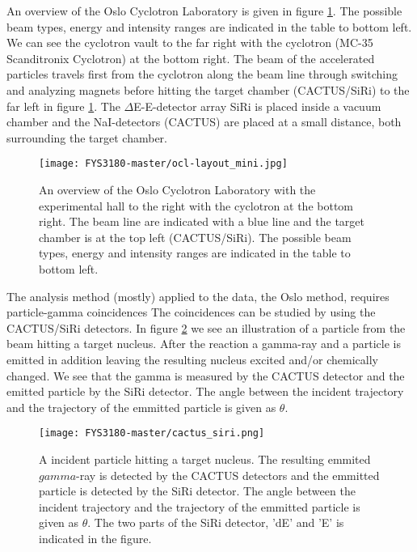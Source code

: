 \documentclass[paper=a4, fontsize=11pt]{scrartcl} %
\begin{document}
An overview of the Oslo Cyclotron Laboratory is given in figure \ref{fig:OLC_exp_hall}. The possible beam types, energy and intensity ranges are indicated in the table to bottom left. We can see the cyclotron vault to the far right with the cyclotron (MC-35 Scanditronix Cyclotron) at the bottom right. The beam of the accelerated particles travels first from the cyclotron along the beam line through switching and analyzing magnets before hitting the target chamber (CACTUS/SiRi) to the far left in figure \ref{fig:OLC_exp_hall}. The $\Delta$E-E-detector array SiRi is placed inside a vacuum chamber and the NaI-detectors (CACTUS) are placed at a small distance, both surrounding the target chamber. 

\begin{figure}[htp]
\centering
\texttt{[image: FYS3180-master/ocl-layout\_mini.jpg]}
\caption{An overview of the Oslo Cyclotron Laboratory with the experimental hall to the right with the cyclotron at the bottom right. The beam line are indicated with a blue line and the target chamber is at the top left (CACTUS/SiRi). The possible beam types, energy and intensity ranges are indicated in the table to bottom left. }
\label{fig:OLC_exp_hall}
\end{figure}

The analysis method (mostly) applied to the data, the Oslo method, requires particle-gamma coincidences The coincidences can be studied by using the CACTUS/SiRi detectors. In figure \ref{fig: cactus_siri} we see an illustration of a particle from the beam hitting a target nucleus. After the reaction a gamma-ray and a particle is emitted in addition leaving the resulting nucleus excited and/or chemically changed. We see that the gamma is measured by the CACTUS detector and the emitted particle by the SiRi detector. The angle between the incident trajectory and the trajectory of the emmitted particle is given as $\theta$.
\begin{figure}[htp]
\centering
\texttt{[image: FYS3180-master/cactus\_siri.png]}
\caption{A incident particle hitting a target nucleus. The resulting emmited $gamma$-ray is detected by the CACTUS detectors and the emmitted particle is detected by the SiRi detector. The angle between the incident trajectory and the trajectory of the emmitted particle is given as $\theta$. The two parts of the SiRi detector, 'dE' and 'E' is indicated in the figure.}
\label{fig: cactus_siri}
\end{figure}
\end{document}
